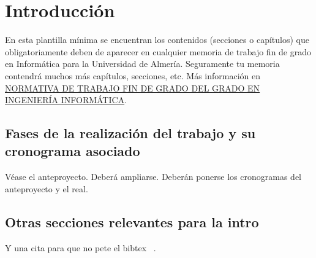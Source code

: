 \chapter{Introducción}
\label{sec:intro}

En esta plantilla mínima se encuentran los contenidos (secciones o
capítulos) que obligatoriamente deben de aparecer en cualquier memoria
de trabajo fin de grado en Informática para la Universidad de
Almería. Seguramente tu memoria contendrá muchos más capítulos,
secciones, etc. Más información en
\href{http://cms.ual.es/idc/groups/public/@academica/@titulaciones/@centro/@politecnica/documents/documento/normativa_tfg_4010.pdf}{NORMATIVA
  DE TRABAJO FIN DE GRADO DEL GRADO EN INGENIERÍA INFORMÁTICA}.

\section{Fases de la realización del trabajo y su cronograma asociado}

Véase el anteproyecto. Deberá ampliarse.
Deberán ponerse los cronogramas del anteproyecto y el real.

\section{Otras secciones relevantes para la intro}

\lipsum[1-15]

Y una cita para que no pete el bibtex ~\cite{einstein1922kosmologische}.
